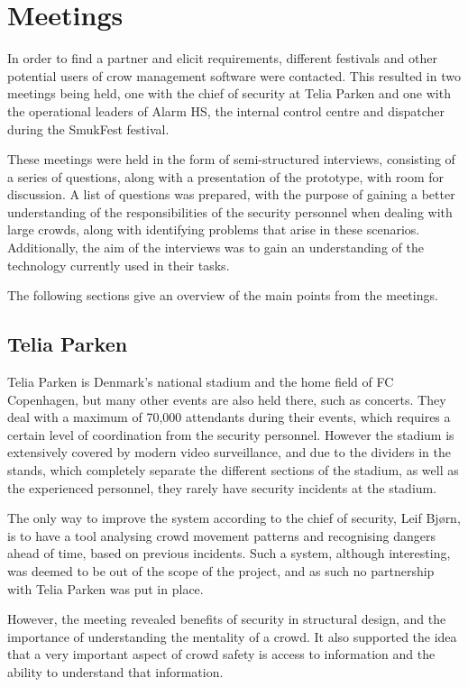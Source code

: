 \section{Meetings} \label{sec:s1_meetings}
In order to find a partner and elicit requirements, different festivals and other potential users of crow management software were contacted. This resulted in two meetings being held, one with the chief of security at Telia Parken and one with the operational leaders of Alarm HS, the internal control centre and dispatcher during the SmukFest festival. 

These meetings were held in the form of semi-structured interviews, consisting of a series of questions, along with a presentation of the prototype, with room for discussion. A list of questions was prepared, with the purpose of gaining a better understanding of the responsibilities of the security personnel when dealing with large crowds, along with identifying problems that arise in these scenarios. Additionally, the aim of the interviews was to gain an understanding of the technology currently used in their tasks.   

The following sections give an overview of the main points from the meetings.


\subsection{Telia Parken}\label{sub:telia_parken_meeting}
Telia Parken is Denmark's national stadium and the home field of FC Copenhagen, but many other events are also held there, such as concerts. They deal with a maximum of 70,000 attendants during their events, which requires a certain level of coordination from the security personnel. However the stadium is extensively covered by modern video surveillance, and due to the dividers in the stands, which completely separate the different sections of the stadium, as  well as the experienced personnel, they rarely have security incidents at the stadium.

The only way to improve the system according to the chief of security, Leif Bjørn, is to have a tool analysing crowd movement patterns and recognising dangers ahead of time, based on previous incidents. Such a system, although interesting, was deemed to be out of the scope of the project, and as such no partnership with Telia Parken was put in place.

However, the meeting revealed benefits of security in structural design, and the importance of understanding the mentality of a crowd. It also supported the idea that a very important aspect of crowd safety is access to information and the ability to understand that information.

